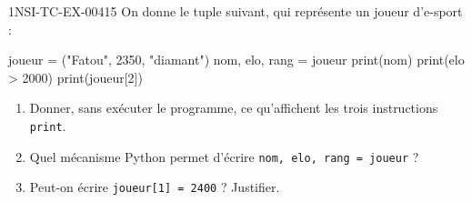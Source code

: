 \begin{exercice}{1NSI-TC-EX-004}{1}{5}
On donne le tuple suivant, qui représente un joueur d'e-sport :
\begin{python}
joueur = ("Fatou", 2350, "diamant")
nom, elo, rang = joueur
print(nom)
print(elo > 2000)
print(joueur[2])
\end{python}
\begin{enumerate}
  \item Donner, sans exécuter le programme, ce qu'affichent les trois instructions \lstinline{print}.
  \item Quel mécanisme Python permet d'écrire \lstinline{nom, elo, rang = joueur} ?
  \item Peut-on écrire \lstinline{joueur[1] = 2400} ? Justifier.
\end{enumerate}
\end{exercice}
